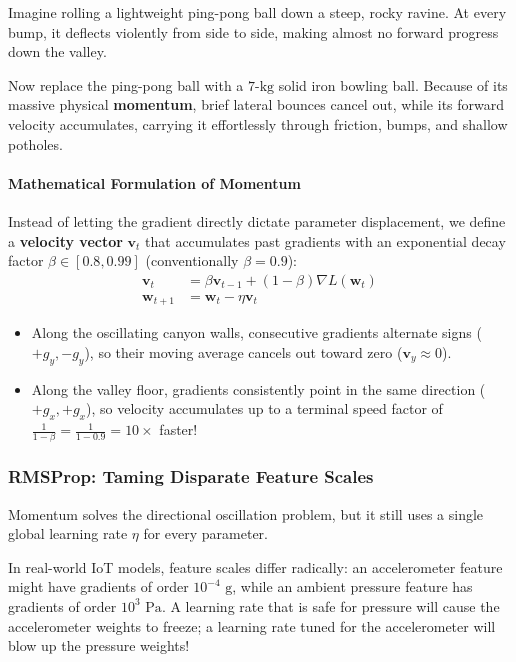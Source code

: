 \begin{analogy}
Imagine rolling a lightweight ping-pong ball down a steep, rocky ravine. At every bump, it deflects violently from side to side, making almost no forward progress down the valley.

Now replace the ping-pong ball with a $7\text{-kg}$ solid iron bowling ball. Because of its massive physical \textbf{momentum}, brief lateral bounces cancel out, while its forward velocity accumulates, carrying it effortlessly through friction, bumps, and shallow potholes.
\end{analogy}

\paragraph{Mathematical Formulation of Momentum}
Instead of letting the gradient directly dictate parameter displacement, we define a \textbf{velocity vector} $\mathbf{v}_t$ that accumulates past gradients with an exponential decay factor $\beta \in [0.8, 0.99]$ (conventionally $\beta = 0.9$):
\begin{align}
\mathbf{v}_t &= \beta \mathbf{v}_{t-1} + (1 - \beta) \nabla L(\mathbf{w}_t) \label{eq:momentum_velocity}\\
\mathbf{w}_{t+1} &= \mathbf{w}_t - \eta \mathbf{v}_t \label{eq:momentum_update}
\end{align}
\begin{itemize}
    \item Along the oscillating canyon walls, consecutive gradients alternate signs ($+g_y, -g_y$), so their moving average cancels out toward zero ($\mathbf{v}_y \approx 0$).
    \item Along the valley floor, gradients consistently point in the same direction ($+g_x, +g_x$), so velocity accumulates up to a terminal speed factor of $\frac{1}{1 - \beta} = \frac{1}{1 - 0.9} = 10\times$ faster!
\end{itemize}

\subsubsection{RMSProp: Taming Disparate Feature Scales}
Momentum solves the directional oscillation problem, but it still uses a single global learning rate $\eta$ for every parameter. 

In real-world IoT models, feature scales differ radically: an accelerometer feature might have gradients of order $10^{-4}\text{ g}$, while an ambient pressure feature has gradients of order $10^{3}\text{ Pa}$. A learning rate that is safe for pressure will cause the accelerometer weights to freeze; a learning rate tuned for the accelerometer will blow up the pressure weights!

